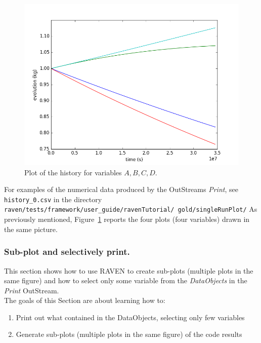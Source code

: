 \begin{figure}[h!]
  \centering
  \includegraphics[scale=0.7]{../../tests/framework/user_guide/ravenTutorial/gold/singleRunPlot/1-historyPlot_line-line-line-line.png}
  \caption{Plot of the history for variables $A,B,C,D$.}
  \label{fig:historyPlotLine}
\end{figure}

For examples of the numerical data produced by the OutStreams \textit{Print}, see \texttt{history\_0.csv} in the directory
 \texttt{raven/tests/framework/user\_guide/ravenTutorial/ gold/singleRunPlot/}
 As previously mentioned, Figure~\ref{fig:historyPlotLine} reports the four plots (four variables) drawn in the same picture.

\subsubsection{Sub-plot and selectively print.}
This section shows how to use RAVEN to create sub-plots (multiple plots in the same figure) and
how to select only some variable from the \textit{DataObjects} in the \textit{Print} OutStream.
 \\ The goals of this Section are about learning how to:
 \begin{enumerate}
   \item Print out what contained in the DataObjects, selecting only few variables
   \item Generate sub-plots (multiple plots in the same figure) of the code results
\end{enumerate}

